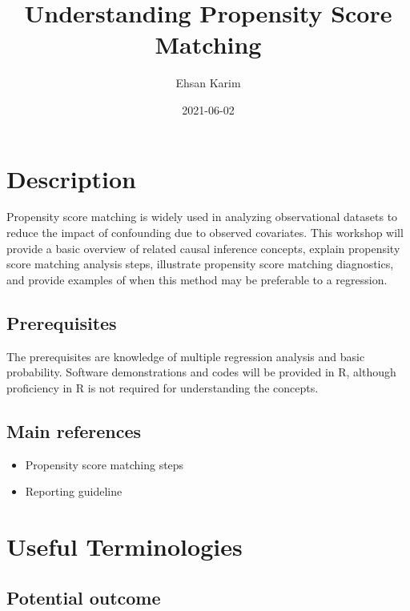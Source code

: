 \documentclass[
]{book}
\title{Understanding Propensity Score Matching}
\author{Ehsan Karim}
\date{2021-06-02}
\providecommand{\tightlist}{%
  \setlength{\itemsep}{0pt}\setlength{\parskip}{0pt}}
\begin{document}
\maketitle

{
\setcounter{tocdepth}{1}
\tableofcontents
}
\hypertarget{description}{%
\chapter{Description}\label{description}}

Propensity score matching is widely used in analyzing observational datasets to reduce the impact of confounding due to observed covariates. This workshop will provide a basic overview of related causal inference concepts, explain propensity score matching analysis steps, illustrate propensity score matching diagnostics, and provide examples of when this method may be preferable to a regression.

\hypertarget{prerequisites}{%
\section{Prerequisites}\label{prerequisites}}

The prerequisites are knowledge of multiple regression analysis and basic probability. Software demonstrations and codes will be provided in R, although proficiency in R is not required for understanding the concepts.

\hypertarget{main-references}{%
\section{Main references}\label{main-references}}

\begin{itemize}
\tightlist
\item
  Propensity score matching steps \citet{austin2011tutorial}
\item
  Reporting guideline \citet{karim2020use}
\end{itemize}

\hypertarget{terms}{%
\chapter{Useful Terminologies}\label{terms}}

\hypertarget{potential-outcome}{%
\section{Potential outcome}\label{potential-outcome}}
\end{document}
